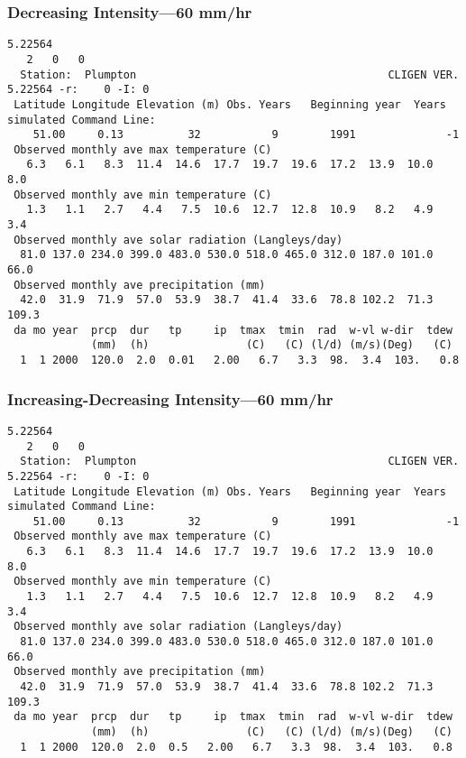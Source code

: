 \subsubsection{Decreasing Intensity---60 mm/hr}
\label{sec:DecreasingIntensity60MmHr}

\begin{verbatim}
5.22564
   2   0   0
  Station:  Plumpton                                       CLIGEN VER. 5.22564 -r:    0 -I: 0
 Latitude Longitude Elevation (m) Obs. Years   Beginning year  Years simulated Command Line:
    51.00     0.13          32           9        1991              -1          
 Observed monthly ave max temperature (C)
   6.3   6.1   8.3  11.4  14.6  17.7  19.7  19.6  17.2  13.9  10.0   8.0
 Observed monthly ave min temperature (C)
   1.3   1.1   2.7   4.4   7.5  10.6  12.7  12.8  10.9   8.2   4.9   3.4
 Observed monthly ave solar radiation (Langleys/day)
  81.0 137.0 234.0 399.0 483.0 530.0 518.0 465.0 312.0 187.0 101.0  66.0
 Observed monthly ave precipitation (mm)
  42.0  31.9  71.9  57.0  53.9  38.7  41.4  33.6  78.8 102.2  71.3 109.3
 da mo year  prcp  dur   tp     ip  tmax  tmin  rad  w-vl w-dir  tdew
             (mm)  (h)               (C)   (C) (l/d) (m/s)(Deg)   (C)
  1  1 2000  120.0  2.0  0.01   2.00   6.7   3.3  98.  3.4  103.   0.8
\end{verbatim}

\subsubsection{Increasing-Decreasing Intensity---60 mm/hr}
\label{sec:IncreasingDecreasingIntensity60MmHr}

\begin{verbatim}
5.22564
   2   0   0
  Station:  Plumpton                                       CLIGEN VER. 5.22564 -r:    0 -I: 0
 Latitude Longitude Elevation (m) Obs. Years   Beginning year  Years simulated Command Line:
    51.00     0.13          32           9        1991              -1          
 Observed monthly ave max temperature (C)
   6.3   6.1   8.3  11.4  14.6  17.7  19.7  19.6  17.2  13.9  10.0   8.0
 Observed monthly ave min temperature (C)
   1.3   1.1   2.7   4.4   7.5  10.6  12.7  12.8  10.9   8.2   4.9   3.4
 Observed monthly ave solar radiation (Langleys/day)
  81.0 137.0 234.0 399.0 483.0 530.0 518.0 465.0 312.0 187.0 101.0  66.0
 Observed monthly ave precipitation (mm)
  42.0  31.9  71.9  57.0  53.9  38.7  41.4  33.6  78.8 102.2  71.3 109.3
 da mo year  prcp  dur   tp     ip  tmax  tmin  rad  w-vl w-dir  tdew
             (mm)  (h)               (C)   (C) (l/d) (m/s)(Deg)   (C)
  1  1 2000  120.0  2.0  0.5   2.00   6.7   3.3  98.  3.4  103.   0.8
\end{verbatim}


